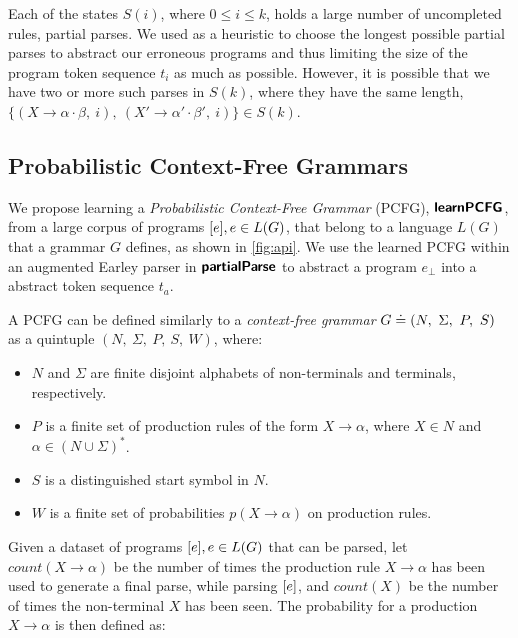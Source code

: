  Each of the states $S(i)$, where $0
\leq i \leq k$, holds a large number of uncompleted rules, \ie partial parses.
We used as a heuristic to choose the longest possible partial parses to abstract
our erroneous programs and thus limiting the size of the program token sequence
$t_i$ as much as possible. However, it is possible that we have two or more such
parses in $S(k)$, where they have the same length, \eg $\{(X \rightarrow \alpha
\cdot \beta,\ i),\ (X' \rightarrow \alpha' \cdot \beta',\ i)\} \in S(k)$.




\subsection{Probabilistic Context-Free Grammars}
\label{sec:prog-abstract:pcfg}
We propose learning a \emph{Probabilistic Context-Free Grammar} (PCFG),
$\bm{\mathsf{learnPCFG}}$, from a large corpus of programs $[e], e \in L(G)$, that
belong to a language $L(G)$ that a grammar $G$ defines, as shown in
\autoref{fig:api}. We use the learned PCFG within an augmented Earley parser in
$\bm{\mathsf{partialParse}}$ to abstract a program $e_{\bot}$ into a abstract token sequence
$t_a$.

A PCFG can be defined similarly to a \emph{context-free grammar} $G \doteq (N,\
\Sigma,\ P,\ S)$ as a quintuple $(N,\ \Sigma,\ P,\ S,\ W)$, where:
\begin{itemize}
    \item $N$ and $\Sigma$ are finite disjoint alphabets of non-terminals and
    terminals, respectively.
    \item $P$ is a finite set of production rules of the form $X \rightarrow
    \alpha$, where $X \in N$ and $\alpha \in (N \cup \Sigma)^{\ast}$.
    \item $S$ is a distinguished start symbol in $N$.
    \item $W$ is a finite set of probabilities $p(X \rightarrow \alpha)$ on
    production rules.
\end{itemize}

Given a dataset of programs $[e], e \in L(G)$ that can be parsed, let
$count(X \rightarrow \alpha)$ be the number of times the production rule $X
\rightarrow \alpha$ has been used to generate a final parse, while parsing
$[e]$, and $count(X)$ be the number of times the non-terminal $X$ has been
seen. The probability for a production $X \rightarrow \alpha$ is then defined
as:

